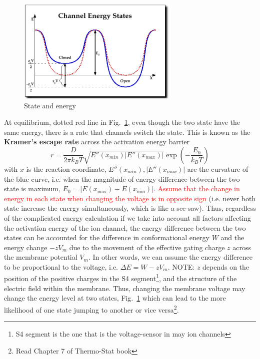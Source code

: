 \begin{figure}[hbt]
  \centerline{\includegraphics[height=5cm,
    angle=0]{./images/state_energy.eps}%
  }
  \caption{State and energy}
  \label{fig:state_energy}
\end{figure}


\label{sec:Kramer-reaction-rate-theory}
At equilibrium, dotted red line in Fig.~\ref{fig:state_energy}, even though the
two state have the same energy, there is a rate that channels switch the state.
This is known as the {\bf Kramer's escape rate} across the activation energy
barrier
\begin{equation}
  \label{eq:691}
  r=\frac{D}{2\pi k_BT} \sqrt{E''(x_{min})|E''(x_{max})|}\exp(-\frac{E_0}{k_BT})
\end{equation}
with $x$ is the reaction coordinate, $E''(x_{min}),|E''(x_{max})|$ are
the curvature of the blue curve, i.e. when the magnitude of energy
difference between the two state is maximum, $E_0=|E(x_\max)-E(x_\min)|$.
\textcolor{red}{Assume that the change in energy in each state when
  changing the voltage is in opposite sign}
(i.e. never both state increase the energy simultaneously, which is like a
see-saw). Thus, regardless of the complicated energy calculation if we take
into account all factors affecting the activation energy of the ion channel,
the energy difference between the two states can be accounted for the
difference in conformational energy $W$ and the energy change $-zV_m$
due to the movement of the effective gating charge $z$ across the
membrane potential $V_m$. In other words, we can assume the energy difference to
be proportional to the voltage, i.e. $\Delta E=W-zV_m$.
NOTE: $z$ depends on the position of the positive charges in the S4
segment\footnote{S4 segment is the one that is the voltage-sensor in may ion
channels}, and the structure of the electric field within the membrane.
Thus, changing the membrane voltage may change the energy level at two
states, Fig.~\ref{fig:state_energy} which can lead to the more
likelihood of one state jumping to
another or vice versa\footnote{Read Chapter 7 of Thermo-Stat book}.

